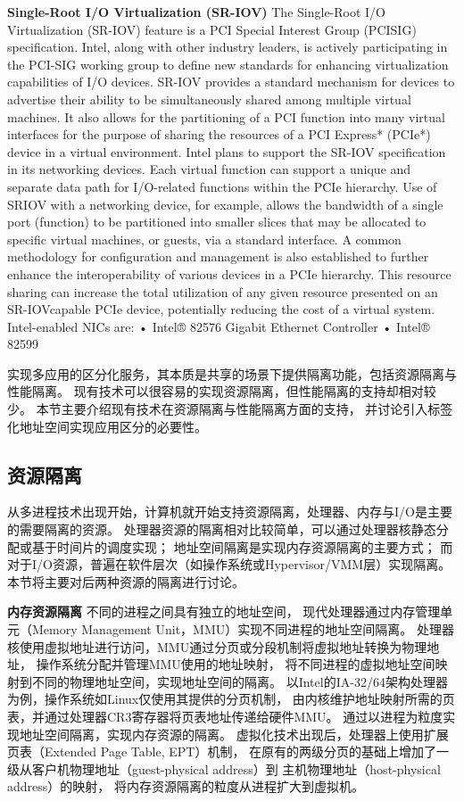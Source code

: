 \textbf{Single-Root I/O Virtualization (SR-IOV)}
The Single-Root I/O Virtualization (SR-IOV)
feature is a PCI Special Interest Group (PCISIG)
specification. Intel, along with other
industry leaders, is actively participating in
the PCI-SIG working group to define new
standards for enhancing virtualization capabilities
of I/O devices. SR-IOV provides a
standard mechanism for devices to advertise
their ability to be simultaneously shared
among multiple virtual machines. It also
allows for the partitioning of a PCI function
into many virtual interfaces for the purpose
of sharing the resources of a PCI Express*
(PCIe*) device in a virtual environment. Intel
plans to support the SR-IOV specification in
its networking devices.
Each virtual function can support a unique
and separate data path for I/O-related functions
within the PCIe hierarchy. Use of SRIOV
with a networking device, for example,
allows the bandwidth of a single port (function)
to be partitioned into smaller slices that
may be allocated to specific virtual machines,
or guests, via a standard interface. A common
methodology for configuration and management
is also established to further
enhance the interoperability of various
devices in a PCIe hierarchy. This resource
sharing can increase the total utilization of
any given resource presented on an SR-IOVcapable
PCIe device, potentially reducing the
cost of a virtual system.
Intel-enabled NICs are:
• Intel® 82576 Gigabit Ethernet Controller
• Intel® 82599

\fi

\iffalse
实现多应用的区分化服务，其本质是共享的场景下提供隔离功能，包括资源隔离与性能隔离。
现有技术可以很容易的实现资源隔离，但性能隔离的支持却相对较少。
本节主要介绍现有技术在资源隔离与性能隔离方面的支持，
并讨论引入标签化地址空间实现应用区分的必要性。

\subsection{资源隔离}

从多进程技术出现开始，计算机就开始支持资源隔离，处理器、内存与I/O是主要的需要隔离的资源。
处理器资源的隔离相对比较简单，可以通过处理器核静态分配或基于时间片的调度实现；
地址空间隔离是实现内存资源隔离的主要方式；
而对于I/O资源，普遍在软件层次（如操作系统或Hypervisor/VMM层）实现隔离。
本节将主要对后两种资源的隔离进行讨论。

\textbf{内存资源隔离}\quad	%
不同的进程之间具有独立的地址空间，
现代处理器通过内存管理单元（Memory Management Unit，MMU）实现不同进程的地址空间隔离。
处理器核使用虚拟地址进行访问，MMU通过分页或分段机制将虚拟地址转换为物理地址，
操作系统分配并管理MMU使用的地址映射，
将不同进程的虚拟地址空间映射到不同的物理地址空间，实现地址空间的隔离。
以Intel的IA-32/64架构处理器为例，操作系统如Linux仅使用其提供的分页机制，
由内核维护地址映射所需的页表，并通过处理器CR3寄存器将页表地址传递给硬件MMU。
通过以进程为粒度实现地址空间隔离，实现内存资源的隔离。
虚拟化技术出现后，处理器上使用扩展页表（Extended Page Table, EPT）机制，
在原有的两级分页的基础上增加了一级从客户机物理地址（guest-physical address）到
主机物理地址（host-physical address）的映射，
将内存资源隔离的粒度从进程扩大到虚拟机。


